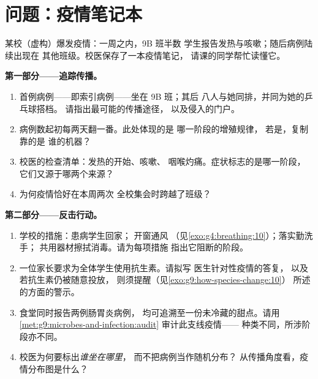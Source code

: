 \section{问题：疫情笔记本}

\begin{problem}\label{pb:g9:microbes-and-infection:1}
某校（虚构）爆发疫情：一周之内，9B 班半数
学生报告发热与咳嗽；随后病例陆续出现在
其他班级。校医保存了一本疫情笔记，
请课的同学帮忙读懂它。

\medskip\noindent\textbf{第一部分——追踪传播。}
\begin{enumerate}
  \item 首例病例——即索引病例——坐在 9B 班；其后
        八人与她同排，并同为她的乒乓球搭档。
        请指出最可能的传播途径，
        以及侵入的门户。
  \item 病例数起初每两天翻一番。此处体现的是
        哪一阶段的增殖规律，
        若是，复制靠的是
        谁的机器？
  \item 校医的检查清单：发热的开始、咳嗽、
        咽喉灼痛。症状标志的是哪一阶段，
        它们又源于哪两个来源？
  \item 为何疫情恰好在本周两次
        全校集会时跨越了班级？
\end{enumerate}

\medskip\noindent\textbf{第二部分——反击行动。}
\begin{enumerate}[resume]
  \item 学校的措施：患病学生回家；
        开窗通风
        （见\cref{exo:g4:breathing:10}）；落实勤洗手；
        共用器材擦拭消毒。请为每项措施
        指出它阻断的阶段。
  \item 一位家长要求为全体学生使用抗生素。请拟写
        医生针对性疫情的答复，
        以及若抗生素仍被随意投放，
        则须提醒（见\cref{exo:g9:how-species-change:10}）
        所述的方面的警示。
  \item 食堂同时报告两例肠胃炎病例，
        均可追溯至一份未冷藏的甜点。请用
        \cref{met:g9:microbes-and-infection:audit}
        审计此支线疫情——
        种类不同，所涉阶段亦不同。
  \item 校医为何要标出\emph{谁坐在哪里}，
        而不把病例当作随机分布？
        从传播角度看，疫情分布图是什么？
\end{enumerate}


\end{problem}
